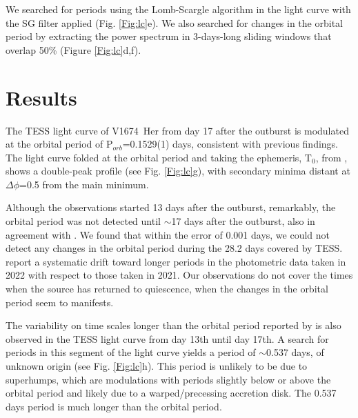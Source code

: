 \documentclass[baaa]{baaa}
\begin{document}
We searched for periods using the Lomb-Scargle \citep{1976Ap&SS..39..447L,1982ApJ...263..835S} algorithm in the light curve with the SG filter applied (Fig. \ref{Fig:lc}e). We also searched for changes in the orbital period by extracting the power spectrum in 3-days-long sliding windows that overlap 50\% (Figure \ref{Fig:lc}d,f). 

\section{Results}
\label{sec:res}

The TESS light curve of V1674~Her from day 17 after the outburst is modulated at the orbital period of P$_{orb}$=0.1529(1) days, consistent with previous findings. The light curve folded at the orbital period and taking the ephemeris, T$_{0}$, from \citet{2022ApJ...940L..56P}, shows a double-peak profile (see Fig. \ref{Fig:lc}g), with secondary minima distant at 
$\Delta\phi$=0.5 from the main minimum. 

Although the observations started 13 days after the outburst, remarkably, the orbital period was not detected until $\sim$17 days after the outburst, also in agreement with \citet{2022ApJ...940L..56P}. 
We found that within the error of 0.001 days, we could not detect any changes in the orbital period during the 28.2 days covered by TESS. \citet{2022ApJ...940L..56P} report a systematic drift toward longer periods in the photometric data taken in 2022 with respect to those taken in 2021. Our observations do not cover the times when the source has returned to quiescence, when the changes in the orbital period seem to manifests.


The variability on time scales longer than the orbital period reported by \citet{2023MNRAS.521.5453S} is also observed in the TESS light curve from day 13th until day 17th. A search for periods in this segment of the light curve yields a period of $\sim$0.537 days, of unknown origin (see Fig. \ref{Fig:lc}h). This period is unlikely to be due to superhumps, which are modulations with periods slightly below or above the orbital period and likely due to a warped/precessing accretion disk. The 0.537 days period is much longer than the orbital period.
\end{document}
